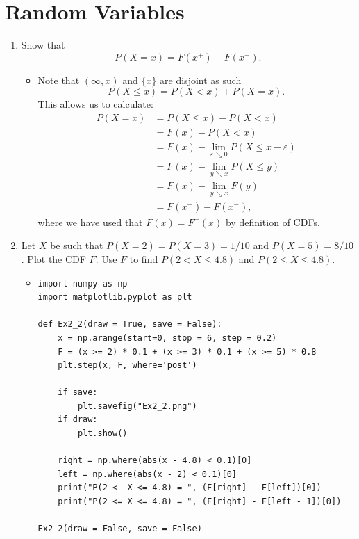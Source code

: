 \documentclass{article}
\begin{document}
\section{Random Variables}
\begin{enumerate}
	\item Show that
	$$
	P(X = x) = F(x^+) - F(x^-).
	$$
		\begin{itemize}
			\item Note that $(\infty, x)$ and $\{x\}$ are disjoint as such
			$$
			P(X \leq x) = P(X < x) + P(X = x).
			$$
			This allows us to calculate:
			$$
			\begin{aligned}
			P(X = x) &= P(X \leq x) - P(X < x) \\
			&= F(x) - P(X < x) \\
			&= F(x) - \lim_{\varepsilon \searrow 0} P(X \leq x - \varepsilon) \\
			&= F(x) - \lim_{y \searrow x} P(X \leq y) \\
			&= F(x) - \lim_{y \searrow x} F(y) \\
			&= F(x^+) - F(x^-),
			\end{aligned}
			$$
			where we have used that $F(x) = F^+(x)$ by definition of CDFs.
		\end{itemize}
	\item Let $X$ be such that $P(X = 2) = P(X = 3) = 1 / 10$ and $P(X = 5) = 8 / 10$. Plot the CDF $F$. Use $F$ to find $P(2 < X \leq 4.8)$ and $P(2 \leq X \leq 4.8)$.
		\begin{itemize}
			\item
			\begin{verbatim}
import numpy as np
import matplotlib.pyplot as plt

def Ex2_2(draw = True, save = False):
    x = np.arange(start=0, stop = 6, step = 0.2)
    F = (x >= 2) * 0.1 + (x >= 3) * 0.1 + (x >= 5) * 0.8
    plt.step(x, F, where='post')

    if save:
        plt.savefig("Ex2_2.png")
    if draw:
        plt.show()

    right = np.where(abs(x - 4.8) < 0.1)[0]
    left = np.where(abs(x - 2) < 0.1)[0]
    print("P(2 <  X <= 4.8) = ", (F[right] - F[left])[0])
    print("P(2 <= X <= 4.8) = ", (F[right] - F[left - 1])[0])

Ex2_2(draw = False, save = False)


\end{verbatim}
\end{itemize}
\end{enumerate}
\end{document}
